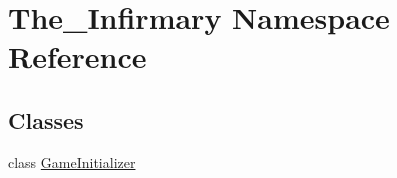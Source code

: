 \hypertarget{namespace_the___infirmary}{}\section{The\+\_\+\+Infirmary Namespace Reference}
\label{namespace_the___infirmary}
\subsection*{Classes}
\begin{DoxyCompactItemize}
\item 
class \mbox{\hyperlink{class_the___infirmary_1_1_game_initializer}{Game\+Initializer}}
\end{DoxyCompactItemize}
